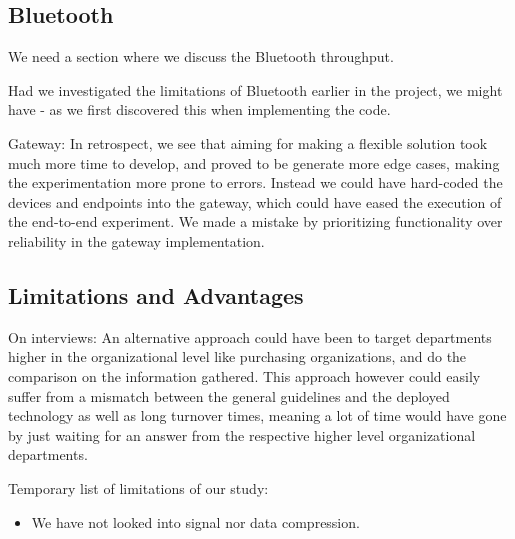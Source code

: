 
\subsection{Bluetooth} %
\label{sub:bluetooth}

We need a section where we discuss the Bluetooth throughput.

Had we investigated the limitations of Bluetooth earlier in the project, we might have - as we first discovered this when implementing the code.

Gateway: In retrospect, we see that aiming for making a flexible solution took much more time to develop, and proved to be generate more edge cases, making the experimentation more prone to errors. Instead we could have hard-coded the devices and endpoints into the gateway, which could have eased the execution of the end-to-end experiment. We made a mistake by prioritizing functionality over reliability in the gateway implementation.


\subsection{Limitations and Advantages} %
\label{sub:limitations}

On interviews: An alternative approach could have been to target departments higher in the organizational level like purchasing organizations, and do the comparison on the information gathered. This approach however could easily suffer from a mismatch between the general guidelines and the deployed technology as well as long turnover times, meaning a lot of time would have gone by just waiting for an answer from the respective higher level organizational departments.

Temporary list of limitations of our study:

\begin{itemize}

  \item We have not looked into signal nor data compression.

\end{itemize}

